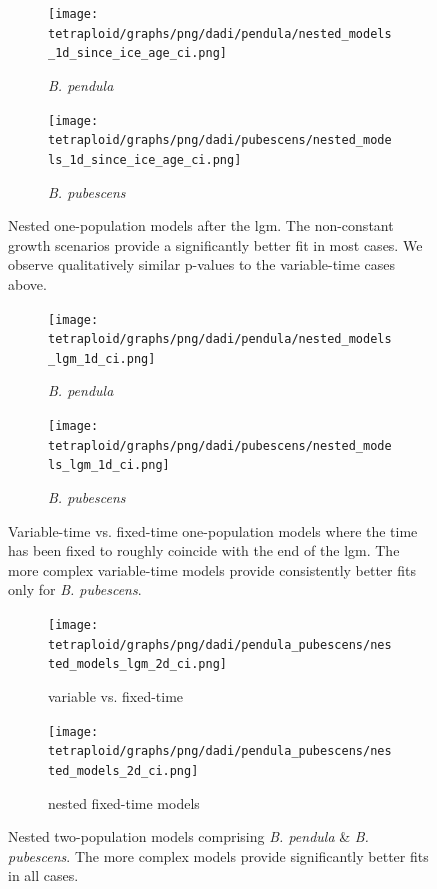\documentclass[hidelinks,11pt]{article}
\newcommand{\pendula}{\textit{B. pendula}}
\newcommand{\pubescens}{\textit{B. pubescens}}
\begin{document}
    \begin{figure}[H]
        \centering
        \begin{subfigure}[b]{0.49\textwidth}
            \texttt{[image: tetraploid/graphs/png/dadi/pendula/nested\_models\_1d\_since\_ice\_age\_ci.png]}
            \caption{\pendula{}}
        \end{subfigure}
        \hfill
        \begin{subfigure}[b]{0.49\textwidth}
            \texttt{[image: tetraploid/graphs/png/dadi/pubescens/nested\_models\_1d\_since\_ice\_age\_ci.png]}
            \caption{\pubescens{}}
        \end{subfigure}
        \caption{Nested one-population models after the \acrshort{lgm}. The non-constant growth scenarios provide a significantly better fit in most cases. We observe qualitatively similar p-values to the variable-time cases above.}
        \label{fig:nested_models_1d_lgm}
    \end{figure}

    \begin{figure}[H]
        \centering
        \begin{subfigure}[b]{0.49\textwidth}
            \texttt{[image: tetraploid/graphs/png/dadi/pendula/nested\_models\_lgm\_1d\_ci.png]}
            \caption{\pendula{}}
        \end{subfigure}
        \hfill
        \begin{subfigure}[b]{0.49\textwidth}
            \texttt{[image: tetraploid/graphs/png/dadi/pubescens/nested\_models\_lgm\_1d\_ci.png]}
            \caption{\pubescens{}}
        \end{subfigure}
        \caption{Variable-time vs. fixed-time one-population models where the time has been fixed to roughly coincide with the end of the \acrshort{lgm}. The more complex variable-time models provide consistently better fits only for \pubescens{}.}
        \label{fig:nested_models_lgm_1d}
    \end{figure}

    \begin{figure}[H]
        \centering
        \begin{subfigure}[b]{0.497\textwidth}
            \texttt{[image: tetraploid/graphs/png/dadi/pendula\_pubescens/nested\_models\_lgm\_2d\_ci.png]}
            \caption{variable vs. fixed-time}
            \label{fig:nested_models_2d_lgm}
        \end{subfigure}
        \hfill
        \begin{subfigure}[b]{0.482\textwidth}
            \texttt{[image: tetraploid/graphs/png/dadi/pendula\_pubescens/nested\_models\_2d\_ci.png]}
            \caption{nested fixed-time models}
            \label{fig:nested_models_2d_sub}
        \end{subfigure}
        \caption{Nested two-population models comprising \pendula{} \& \pubescens{}. The more complex models provide significantly better fits in all cases.}
        \label{fig:nested_models_2d}
    \end{figure}
\end{document}
